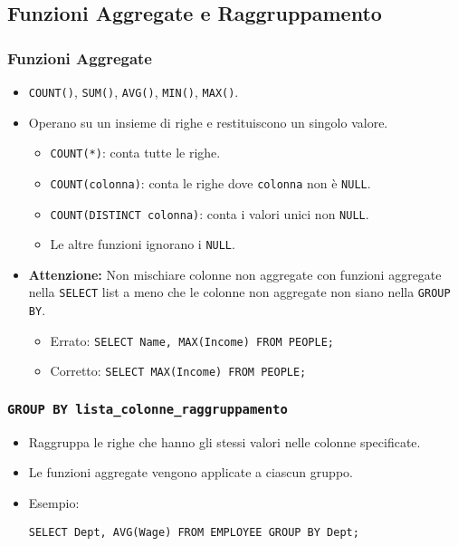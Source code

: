 \subsection{Funzioni Aggregate e Raggruppamento}

\subsubsection{Funzioni Aggregate}
\begin{itemize}
	\item \texttt{COUNT()}, \texttt{SUM()}, \texttt{AVG()}, \texttt{MIN()}, \texttt{MAX()}.
	\item Operano su un insieme di righe e restituiscono un singolo valore.
	\begin{itemize}
		\item \texttt{COUNT(*)}: conta tutte le righe.
		\item \texttt{COUNT(colonna)}: conta le righe dove \texttt{colonna} non è \texttt{NULL}.
		\item \texttt{COUNT(DISTINCT colonna)}: conta i valori unici non \texttt{NULL}.
		\item Le altre funzioni ignorano i \texttt{NULL}.
	\end{itemize}
	\item \textbf{Attenzione:} Non mischiare colonne non aggregate con funzioni aggregate nella \texttt{SELECT} list a meno che le colonne non aggregate non siano nella \texttt{GROUP BY}.
	\begin{itemize}
		\item Errato: \texttt{SELECT Name, MAX(Income) FROM PEOPLE;}
		\item Corretto: \texttt{SELECT MAX(Income) FROM PEOPLE;}
	\end{itemize}
\end{itemize}

\subsubsection{\texttt{GROUP BY lista\_colonne\_raggruppamento}}
\begin{itemize}
	\item Raggruppa le righe che hanno gli stessi valori nelle colonne specificate.
	\item Le funzioni aggregate vengono applicate a ciascun gruppo.
	\item Esempio:
	\begin{verbatim}
SELECT Dept, AVG(Wage) FROM EMPLOYEE GROUP BY Dept;
	\end{verbatim}
\end{itemize}

